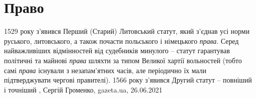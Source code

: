  
 
 
 
 
\chapter{Право}

1529 року з'явився Перший (Старий) Литовський статут, який з'єднав усі норми
руського, литовського, а також почасти польського і німецького \emph{права}. Серед
найважливіших відмінностей від судебників минулого – статут гарантував
політичні та майнові \emph{права} шляхти за типом Великої хартії вольностей (тобто
самі \emph{права} існували з незапам'ятних часів, але періодично їх мали
підтверджувати чергові правителі). 1566 року з'явився Другий статут – повніший
і точніший
, 
Сергій Громенко, gazeta.ua, 26.06.2021
